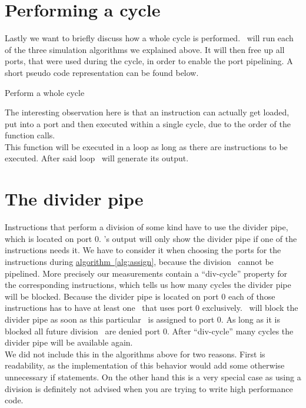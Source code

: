 \section{Performing a cycle}

Lastly we want to briefly discuss how a whole cycle is performed. \suaca\ will run each of the three simulation algorithms we explained above. It will then free up all ports, that were used during the cycle, in order to enable the port pipelining. A short pseudo code representation can be found below.

\begin{algorithm}[H]
    \SetAlgoLined
    \caption{Perform a whole cycle}
\end{algorithm}

The interesting observation here is that an instruction can actually get loaded, put into a port and then executed within a single cycle, due to the order of the function calls.\\
This function will be executed in a loop as long as there are instructions to be executed. After said loop \suaca\ will generate its output.


\section{The divider pipe}
\label{sec:dividerpipe}

Instructions that perform a division of some kind have to use the divider pipe, which is located on port $0$. \suaca's output will only show the divider pipe if one of the instructions needs it. We have to consider it when choosing the ports for the instructions during \hyperref[alg:assign]{algorithm~\ref*{alg:assign}}, because the division \microops\ cannot be pipelined. More precisely our measurements contain a ``div-cycle'' property for the corresponding instructions, which tells us how many cycles the divider pipe will be blocked. Because the divider pipe is located on port $0$ each of those instructions has to have at least one \microop\ that uses port $0$ exclusively. \suaca\ will block the divider pipe as soon as this particular \microop\ is assigned to port $0$. As long as it is blocked all future division \microops\ are denied port $0$. After ``div-cycle'' many cycles the divider pipe will be available again.\\
We did not include this in the algorithms above for two reasons. First is readability, as the implementation of this behavior would add some otherwise unnecessary if statements. On the other hand this is a very special case as using a division is definitely not advised when you are trying to write high performance code.
